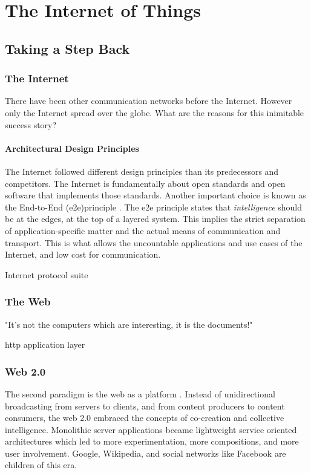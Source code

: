 \chapter{The Internet of Things}
\label{sec:iot}

\section{Taking a Step Back}

\subsection{The Internet}

There have been other communication networks before the Internet. However only the Internet spread over the globe. What are the reasons for this inimitable success story?

\subsubsection{Architectural Design Principles}

The Internet followed different design principles than its predecessors and competitors. The Internet is fundamentally about open standards and open software that implements those standards. Another important choice is known as the End-to-End (e2e)principle \cite{Saltzer:1984:EAS:357401.357402}. The e2e principle states that \emph{intelligence} should be at the edges, at the top of a layered system. This implies the strict separation of application-specific matter and the actual means of communication and transport. This is what allows the uncountable applications and use cases of the Internet, and low cost for communication.

Internet protocol suite

\subsection{The Web}
"It's not the computers which are interesting, it is the documents!"

http application layer


\subsection{Web 2.0}

The second paradigm is the web as a platform \cite{o2007web}. Instead of unidirectional broadcasting from servers to clients, and from content producers to content consumers, the web 2.0 embraced the concepts of co-creation and collective intelligence. Monolithic server applications became lightweight service oriented architectures which led to more experimentation, more compositions, and more user involvement. Google, Wikipedia, and social networks like Facebook are children of this era.

